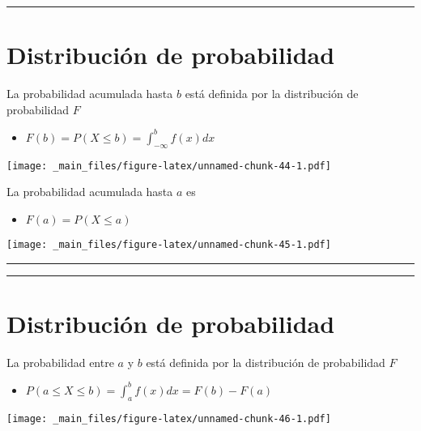 \documentclass[
]{book}
\providecommand{\tightlist}{%
  \setlength{\itemsep}{0pt}\setlength{\parskip}{0pt}}
\begin{document}
\begin{center}\rule{0.5\linewidth}{0.5pt}\end{center}

\hypertarget{distribuciuxf3n-de-probabilidad-1}{%
\section{Distribución de probabilidad}\label{distribuciuxf3n-de-probabilidad-1}}

La probabilidad acumulada hasta \(b\) está definida por la distribución de probabilidad \(F\)

\begin{itemize}
\tightlist
\item
  \(F(b) = P(X \leq b)=\int_{-\infty}^bf(x)dx\)
\end{itemize}

\texttt{[image: \_main\_files/figure-latex/unnamed-chunk-44-1.pdf]}

La probabilidad acumulada hasta \(a\) es

\begin{itemize}
\tightlist
\item
  \(F(a) = P(X \leq a)\)
\end{itemize}

\texttt{[image: \_main\_files/figure-latex/unnamed-chunk-45-1.pdf]}

\begin{center}\rule{0.5\linewidth}{0.5pt}\end{center}

\begin{center}\rule{0.5\linewidth}{0.5pt}\end{center}

\hypertarget{distribuciuxf3n-de-probabilidad-2}{%
\section{Distribución de probabilidad}\label{distribuciuxf3n-de-probabilidad-2}}

La probabilidad entre \(a\) y \(b\) está definida por la distribución de probabilidad \(F\)

\begin{itemize}
\tightlist
\item
  \(P(a\leq X \leq b) = \int_a^b f(x)dx=F(b)-F(a)\)
\end{itemize}

\texttt{[image: \_main\_files/figure-latex/unnamed-chunk-46-1.pdf]}
\end{document}
